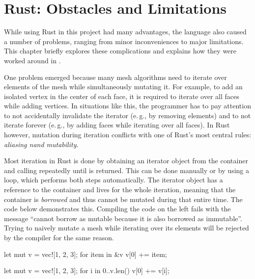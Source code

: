 \chapter{Rust: Obstacles and Limitations}
\label{chap:rust-limitations}

While using Rust in this project had many advantages, the language also caused a number of problems, ranging from minor inconveniences to major limitations.
This chapter briefly explores these complications and explains how they were worked around in .

\vfill

One problem emerged because many mesh algorithms need to iterate over elements of the mesh while simultaneously mutating it.
For example, to add an isolated vertex in the center of each face, it is required to iterate over all faces while adding vertices.
In situations like this, the programmer has to pay attention to not accidentally invalidate the iterator (e.\,g., by removing elements) and to not iterate forever (e.\,g., by adding faces while iterating over all faces).
In Rust however, mutation during iteration conflicts with one of Rust's most central rules: \emph{aliasing nand mutability}.

Most iteration in Rust is done by obtaining an iterator object from the container and calling  repeatedly until  is returned.
This can be done manually or by using a  loop, which performs both steps automatically.
The iterator object has a reference to the container and lives for the whole iteration, meaning that the container is \emph{borrowed} and thus cannot be mutated during that entire time.
The code below demonstrates this.
Compiling the code on the left fails with the message \enquote{cannot borrow  as mutable because it is also borrowed as immutable}.
Trying to naively mutate a mesh while iterating over its elements will be rejected by the compiler for the same reason.

\vspace{5mm}
\begin{minipage}{0.49\textwidth}
  \begin{rustcode}
    let mut v = vec![1, 2, 3];
    for item in &v {
        v[0] += item;
    }
  \end{rustcode}
\end{minipage}
\begin{minipage}{0.49\textwidth}
  \begin{rustcode}
    let mut v = vec![1, 2, 3];
    for i in 0..v.len() {
        v[0] += v[i];
    }
  \end{rustcode}
\end{minipage}
\vspace{5mm}

